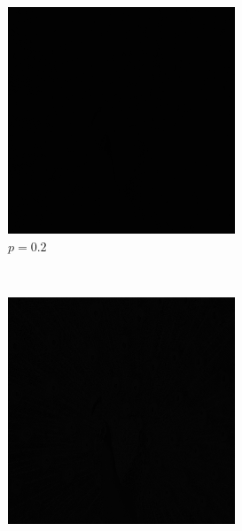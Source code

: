 \documentclass{article}
\begin{document}
\begin{enumerate}[label=(\alph*)]
    \begin{figure}[!htb]
        \centering
        \begin{subfigure}[b]{0.3\textwidth}
            \includegraphics[width=\textwidth]{img/PL02.png}
            \caption{$p = 0.2$}
        \end{subfigure}
        ~
        \begin{subfigure}[b]{0.3\textwidth}
            \includegraphics[width=\textwidth]{img/PL04.png}

\end{subfigure}
\end{figure}
\end{enumerate}
\end{document}
